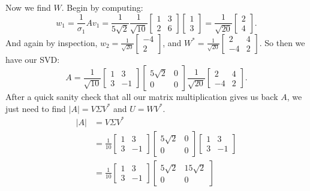 \documentclass{article}
\begin{document}
\begin{enumerate}
\begin{enumerate}[label= (\alph*)]
    Now we find $W$. Begin by computing: 
    \[
        w_1=\frac{1}{\sigma_1}Av_1=\frac{1}{5\sqrt{2} }\frac{1}{\sqrt{10} }\begin{bmatrix} 1&3\\2&6 \end{bmatrix} \begin{bmatrix} 1\\3 \end{bmatrix} =\frac{1}{\sqrt{20} }\begin{bmatrix} 2\\4 \end{bmatrix} 
    .\] 
        And again by inspection, $w_2=\frac{1}{\sqrt{20} }\begin{bmatrix} -4\\2 \end{bmatrix} $, and $W^* =\frac{1}{\sqrt{20} }\begin{bmatrix} 2&4\\-4&2 \end{bmatrix} $. So then we have our SVD:
    \[
        A=\frac{1}{\sqrt{10} }\begin{bmatrix} 1&3\\3&-1 \end{bmatrix} \begin{bmatrix} 5\sqrt{2} &0\\0&0 \end{bmatrix} \frac{1}{\sqrt{20} }\begin{bmatrix} 2&4\\-4&2 \end{bmatrix} 
    .\] 
    After a quick sanity check that all our matrix multiplication gives us back $A$, we just need to find $|A|=V\Sigma V^* $ and $U=WV^* $.
    \begin{align*}
        |A|&=V\Sigma V^* \\
           &=\frac{1}{10}\begin{bmatrix} 1&3\\3&-1 \end{bmatrix} \begin{bmatrix} 5\sqrt{2} &0\\0&0 \end{bmatrix} \begin{bmatrix} 1&3\\3&-1 \end{bmatrix} \\
           &=\frac{1}{10}\begin{bmatrix} 1&3\\3&-1 \end{bmatrix} \begin{bmatrix} 5\sqrt{2} &15\sqrt{2} \\0&0 \end{bmatrix} \\

\end{align*}
\end{enumerate}
\end{enumerate}
\end{document}
